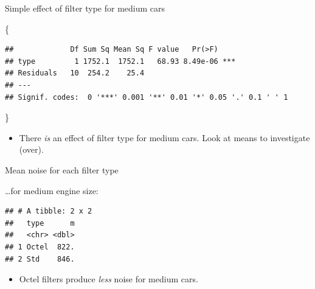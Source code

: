 \documentclass[ignorenonframetext,]{beamer}
\newenvironment{Shaded}{\begin{snugshade}}{\end{snugshade}}
\newcommand{\DataTypeTok}[1]{\textcolor[rgb]{0.13,0.29,0.53}{#1}}
\newcommand{\KeywordTok}[1]{\textcolor[rgb]{0.13,0.29,0.53}{\textbf{#1}}}
\newcommand{\NormalTok}[1]{#1}
\newcommand{\OperatorTok}[1]{\textcolor[rgb]{0.81,0.36,0.00}{\textbf{#1}}}
\newcommand{\StringTok}[1]{\textcolor[rgb]{0.31,0.60,0.02}{#1}}
\providecommand{\tightlist}{%
  \setlength{\itemsep}{0pt}\setlength{\parskip}{0pt}}
\begin{document}
\begin{frame}[fragile]{Simple effect of filter type for medium cars}
\protect\hypertarget{simple-effect-of-filter-type-for-medium-cars}{}

\{\small

\begin{Shaded}
\end{Shaded}

\begin{verbatim}
##             Df Sum Sq Mean Sq F value   Pr(>F)    
## type         1 1752.1  1752.1   68.93 8.49e-06 ***
## Residuals   10  254.2    25.4                     
## ---
## Signif. codes:  0 '***' 0.001 '**' 0.01 '*' 0.05 '.' 0.1 ' ' 1
\end{verbatim}

\}

\begin{itemize}
\tightlist
\item
  There \emph{is} an effect of filter type for medium cars. Look at
  means to investigate (over).
\end{itemize}

\end{frame}

\begin{frame}[fragile]{Mean noise for each filter type}
\protect\hypertarget{mean-noise-for-each-filter-type}{}

\ldots for medium engine size:

\begin{Shaded}
\end{Shaded}

\begin{verbatim}
## # A tibble: 2 x 2
##   type      m
##   <chr> <dbl>
## 1 Octel  822.
## 2 Std    846.
\end{verbatim}

\begin{itemize}
\tightlist
\item
  Octel filters produce \emph{less} noise for medium cars.
\end{itemize}

\end{frame}
\end{document}
